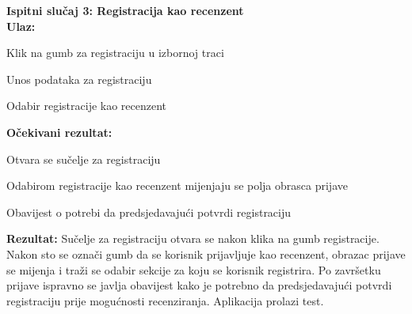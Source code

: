 			
			 \noindent \textbf{Ispitni slučaj 3: Registracija kao recenzent}\\
			  \textbf{Ulaz:}
			 \begin{packed_enum}
			 	\item {Klik na gumb za registraciju u izbornoj traci}
			 	\item {Unos podataka za registraciju}
			 	\item {Odabir registracije kao recenzent}
			 \end{packed_enum}
			 \textbf{Očekivani rezultat:}
			 \begin{packed_enum}
			 	\item {Otvara se sučelje za registraciju}
			 	\item {Odabirom registracije kao recenzent mijenjaju se polja obrasca prijave}
			 	\item {Obavijest o potrebi da predsjedavajući potvrdi registraciju}
			 \end{packed_enum}
			  \textbf{Rezultat: }Sučelje za registraciju otvara se nakon klika na gumb registracije. Nakon sto se označi gumb da se korisnik prijavljuje kao recenzent, obrazac prijave se mijenja i traži se odabir sekcije za koju se korisnik registrira. Po završetku prijave ispravno se javlja obavijest kako je potrebno da predsjedavajući potvrdi registraciju prije mogućnosti recenziranja. {\color{green} Aplikacija prolazi test.}\\
			  

